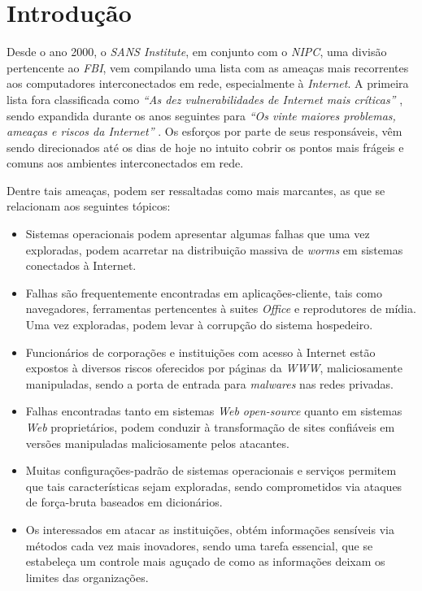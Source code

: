 \chapter*{Introdução}

Desde o ano 2000, o \textit{SANS Institute}, em conjunto com o \textit{NIPC}, uma divisão pertencente ao \textit{FBI}, vem compilando uma lista com as ameaças mais recorrentes aos computadores interconectados em rede, especialmente à \textit{Internet}. A primeira lista fora classificada como \textit{``As dez vulnerabilidades de Internet mais críticas''} \cite{Top10Sans}, sendo expandida durante os anos seguintes para \textit{``Os vinte maiores problemas, ameaças e riscos da Internet''} \cite{Top20Sans}. Os esforços por parte de seus responsáveis, vêm sendo direcionados até os dias de hoje no intuito cobrir os pontos mais frágeis e comuns aos ambientes interconectados em rede.

Dentre tais ameaças, podem ser ressaltadas como mais marcantes, as que se relacionam aos seguintes tópicos:

\begin{itemize}
    \item Sistemas operacionais podem apresentar algumas falhas que uma vez exploradas, podem acarretar na distribuição massiva de \textit{worms} em sistemas conectados à Internet.
    \item Falhas são frequentemente encontradas em aplicações-cliente, tais como navegadores, ferramentas pertencentes à suites \textit{Office} e reprodutores de mídia. Uma vez exploradas, podem levar à corrupção do sistema hospedeiro.
    \item Funcionários de corporações e instituições com acesso à Internet estão expostos à diversos riscos oferecidos por páginas da \textit{WWW},  maliciosamente manipuladas, sendo a porta de entrada para \textit{malwares} nas redes privadas.
    \item Falhas encontradas tanto em sistemas \textit{Web open-source} quanto em sistemas \textit{Web} proprietários, podem conduzir à transformação de sites confiáveis em versões manipuladas maliciosamente pelos atacantes.
    \item Muitas configurações-padrão de sistemas operacionais e serviços permitem que tais características sejam exploradas, sendo comprometidos via ataques de força-bruta baseados em dicionários.
    \item Os interessados em atacar as instituições, obtém informações sensíveis via métodos cada vez mais inovadores, sendo uma tarefa essencial, que se estabeleça um controle mais aguçado de como as informações deixam os limites das organizações.
\end{itemize}

